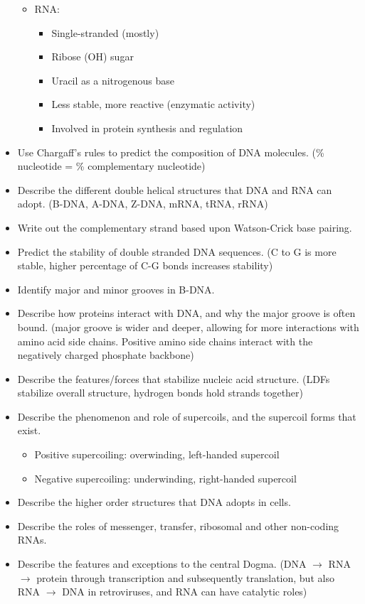 \documentclass[letterpaper, 12pt]{article}
\begin{document}
\begin{itemize}
\begin{itemize}
\item RNA:
\begin{itemize}
\item Single-stranded (mostly)
\item Ribose (OH) sugar
\item Uracil as a nitrogenous base
\item Less stable, more reactive (enzymatic activity)
\item Involved in protein synthesis and regulation
\end{itemize}
\end{itemize}
\item Use Chargaff’s rules to predict the composition of DNA molecules. (\% nucleotide = \% complementary nucleotide)
\item Describe the different double helical structures that DNA and RNA can adopt. (B-DNA, A-DNA, Z-DNA, mRNA, tRNA, rRNA)
\item Write out the complementary strand based upon Watson-Crick base pairing.
\item Predict the stability of double stranded DNA sequences. (C to G is more stable, higher percentage of C-G bonds increases stability)
\item Identify major and minor grooves in B-DNA.
\item Describe how proteins interact with DNA, and why the major groove is often bound. (major groove is wider and deeper, allowing for more interactions with amino acid side chains. Positive amino side chains interact with the negatively charged phosphate backbone)
\item Describe the features/forces that stabilize nucleic acid structure. (LDFs stabilize overall structure, hydrogen bonds hold strands together)
\item Describe the phenomenon and role of supercoils, and the supercoil forms that exist.
\begin{itemize}
\item Positive supercoiling: overwinding, left-handed supercoil
\item Negative supercoiling: underwinding, right-handed supercoil
\end{itemize}
\item Describe the higher order structures that DNA adopts in cells. 
\item Describe the roles of messenger, transfer, ribosomal and other non-coding RNAs.
\item Describe the features and exceptions to the central Dogma. (DNA $\to$ RNA $\to$ protein through transcription and subsequently translation, but also RNA $\to$ DNA in retroviruses, and RNA can have catalytic roles)

\end{itemize}
\end{document}
